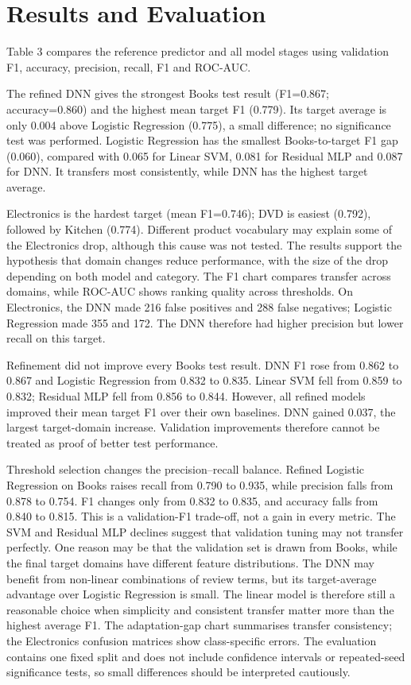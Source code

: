 \documentclass[11pt,a4paper]{article}
\begin{document}
\section{Results and Evaluation}
Table 3 compares the reference predictor and all model stages using validation F1, accuracy, precision, recall, F1 and ROC-AUC.

\begin{landscape}

\end{landscape}

The refined DNN gives the strongest Books test result (F1=0.867; accuracy=0.860) and the highest mean target F1 (0.779). Its target average is only 0.004 above Logistic Regression (0.775), a small difference; no significance test was performed. Logistic Regression has the smallest Books-to-target F1 gap (0.060), compared with 0.065 for Linear SVM, 0.081 for Residual MLP and 0.087 for DNN. It transfers most consistently, while DNN has the highest target average.

Electronics is the hardest target (mean F1=0.746); DVD is easiest (0.792), followed by Kitchen (0.774). Different product vocabulary may explain some of the Electronics drop, although this cause was not tested. The results support the hypothesis that domain changes reduce performance, with the size of the drop depending on both model and category. The F1 chart compares transfer across domains, while ROC-AUC shows ranking quality across thresholds. On Electronics, the DNN made 216 false positives and 288 false negatives; Logistic Regression made 355 and 172. The DNN therefore had higher precision but lower recall on this target.

Refinement did not improve every Books test result. DNN F1 rose from 0.862 to 0.867 and Logistic Regression from 0.832 to 0.835. Linear SVM fell from 0.859 to 0.832; Residual MLP fell from 0.856 to 0.844. However, all refined models improved their mean target F1 over their own baselines. DNN gained 0.037, the largest target-domain increase. Validation improvements therefore cannot be treated as proof of better test performance.

Threshold selection changes the precision--recall balance. Refined Logistic Regression on Books raises recall from 0.790 to 0.935, while precision falls from 0.878 to 0.754. F1 changes only from 0.832 to 0.835, and accuracy falls from 0.840 to 0.815. This is a validation-F1 trade-off, not a gain in every metric. The SVM and Residual MLP declines suggest that validation tuning may not transfer perfectly. One reason may be that the validation set is drawn from Books, while the final target domains have different feature distributions. The DNN may benefit from non-linear combinations of review terms, but its target-average advantage over Logistic Regression is small. The linear model is therefore still a reasonable choice when simplicity and consistent transfer matter more than the highest average F1. The adaptation-gap chart summarises transfer consistency; the Electronics confusion matrices show class-specific errors. The evaluation contains one fixed split and does not include confidence intervals or repeated-seed significance tests, so small differences should be interpreted cautiously.
\end{document}

